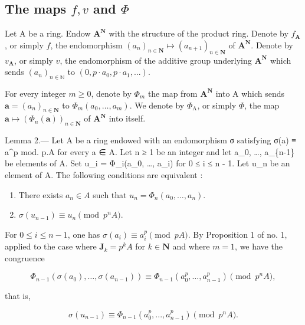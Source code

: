 \subsection{\texorpdfstring{The maps \(f, v\) and \(\Phi\)}{The maps f, v, and Φ}}

Let A be a ring. Endow \(\mathbf{A}^{\mathbf{N}}\) with the structure of the product ring. Denote by \(f_{\mathbf{A}}\), or simply \(f\), the endomorphism \((a_{n})_{n\in\mathbf{N}}\mapsto(a_{n+1})_{n\in\mathbf{N}}\) of \(\mathbf{A}^{\mathbf{N}}\). Denote by \(v_{\mathbf{A}}\), or simply \(v\), the endomorphism of the additive group underlying \(\mathbf{A}^{\mathbf{N}}\) which sends \((a_{n})_{n\in\mathbb{N}}\) to \((0,p\cdot a_{0},p\cdot a_{1},...)\).

For every integer \(m \geqslant 0\), denote by \(\Phi_{m}\) the map from \(\mathbf{A}^{\mathbf{N}}\) into A which sends \(\boldsymbol{a} = (a_{n})_{n \in \mathbf{N}}\) to \(\Phi_{m}(a_{0}, \ldots, a_{m})\). We denote by \(\Phi_{\mathrm{A}}\), or simply \(\Phi\), the map \(\boldsymbol{a} \mapsto (\Phi_{n}(\boldsymbol{a}))_{n \in \mathbf{N}}\) of \(\mathbf{A}^{\mathbf{N}}\) into itself.

Lemma 2.--- Let A be a ring endowed with an endomorphism σ satisfying σ(a) ≡ a\^{}p mod. p.A for every a ∈ A. Let n ≥ 1 be an integer and let a\_0, \ldots, a\_\{n-1\} be elements of A. Set u\_i = Φ\_i(a\_0, \ldots, a\_i) for 0 ≤ i ≤ n - 1. Let u\_n be an element of A. The following conditions are equivalent :

\begin{enumerate}
\def\labelenumi{\alph{enumi})}
\item
  There exists \(a_{n} \in A\) such that \(u_{n} = \Phi_{n}(a_{0}, \ldots, a_{n})\).
\item
  \(\sigma(u_{n-1}) \equiv u_n \pmod{p^nA}\).
\end{enumerate}

For \(0 \leqslant i \leqslant n - 1\), one has \(\sigma(a_i) \equiv a_i^p \pmod{pA}\). By Proposition 1 of no. 1, applied to the case where \(\mathbf{J}_k = p^kA\) for \(k \in \mathbf{N}\) and where \(m = 1\), we have the congruence

\[
\Phi_ {n - 1} \left(\sigma \left(a _ {0}\right), \dots , \sigma \left(a _ {n - 1}\right)\right) \equiv \Phi_ {n - 1} \left(a _ {0} ^ {p}, \dots , a _ {n - 1} ^ {p}\right) \pmod{p ^ {n}A},\tag{7}
\]

that is,

\[
\sigma (u _ {n - 1}) \equiv \Phi_ {n - 1} (a _ {0} ^ {p},..., a _ {n - 1} ^ {p}) \pmod{p ^ {n}A}.\tag{8}
\]

